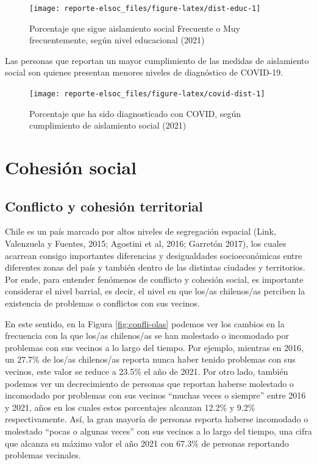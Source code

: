 \documentclass[
  12pt,
]{book}
\begin{document}
\begin{figure}

{\centering \texttt{[image: reporte-elsoc\_files/figure-latex/dist-educ-1]} 

}

\caption{Porcentaje que sigue aislamiento social Frecuente o Muy frecuentemente, según nivel educacional (2021)}\label{fig:dist-educ}
\end{figure}

Las personas que reportan un mayor cumplimiento de las medidas de aislamiento social son quienes presentan menores niveles de diagnóstico de COVID-19.

\begin{figure}

{\centering \texttt{[image: reporte-elsoc\_files/figure-latex/covid-dist-1]} 

}

\caption{Porcentaje que ha sido diagnosticado con COVID, según cumplimiento de aislamiento social (2021)}\label{fig:covid-dist}
\end{figure}

\hypertarget{cohesiuxf3n-social}{%
\chapter{Cohesión social}\label{cohesiuxf3n-social}}

\hypertarget{conflicto-y-cohesiuxf3n-territorial}{%
\section{Conflicto y cohesión territorial}\label{conflicto-y-cohesiuxf3n-territorial}}

Chile es un país marcado por altos niveles de segregación espacial (Link, Valenzuela y Fuentes, 2015; Agostini et al, 2016; Garretón 2017), los cuales acarrean consigo importantes diferencias y desigualdades socioeconómicas entre diferentes zonas del país y también dentro de las distintas ciudades y territorios. Por ende, para entender fenómenos de conflicto y cohesión social, es importante considerar el nivel barrial, es decir, el nivel en que los/as chilenos/as perciben la existencia de problemas o conflictos con sus vecinos.

En este sentido, en la Figura \ref{fig:confli-olas} podemos ver los cambios en la frecuencia con la que los/as chilenos/as se han molestado o incomodado por problemas con sus vecinos a lo largo del tiempo. Por ejemplo, mientras en 2016, un 27.7\% de los/as chilenos/as reporta nunca haber tenido problemas con sus vecinos, este valor se reduce a 23.5\% el año de 2021. Por otro lado, también podemos ver un decrecimiento de personas que reportan haberse molestado o incomodado por problemas con sus vecinos ``muchas veces o siempre'' entre 2016 y 2021, años en los cuales estos porcentajes alcanzan 12.2\% y 9.2\% respectivamente. Así, la gran mayoría de personas reporta haberse incomodado o molestado ``pocas o algunas veces'' con sus vecinos a lo largo del tiempo, una cifra que alcanza su máximo valor el año 2021 con 67.3\% de personas reportando problemas vecinales.
\end{document}
